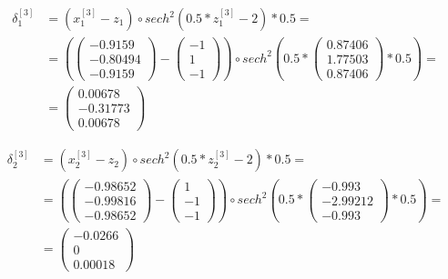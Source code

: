 \documentclass[12pt]{article}
\begin{document}
\begin{enumerate}[leftmargin=\labelsep]
          \begin{align*}
            \delta^{[3]}_1 &= (x^{[3]}_1 - z_1) \circ  sech^{2}(0.5*z^{[3]}_1 - 2) * 0.5 =  \\
            &=  (\begin{pmatrix} -0.9159 \\ -0.80494 \\ -0.9159\end{pmatrix} - \begin{pmatrix} -1 \\ 1 \\ -1 \end{pmatrix}) \circ sech^{2}(0.5* \begin{pmatrix} 0.87406 \\ 1.77503 \\ 0.87406\end{pmatrix} * 0.5) = \\
            &= \begin{pmatrix} 0.00678 \\ -0.31773 \\ 0.00678 \end{pmatrix} 
          \end{align*}

          \begin{align*}
            \delta^{[3]}_2 &= (x^{[3]}_2 - z_2) \circ  sech^{2}(0.5*z^{[3]}_2 - 2) * 0.5 =  \\
            &=  (\begin{pmatrix} -0.98652 \\ -0.99816 \\ -0.98652\end{pmatrix} - \begin{pmatrix} 1 \\ -1 \\ -1\end{pmatrix}) \circ sech^{2}(0.5* \begin{pmatrix} -0.993 \\ -2.99212 \\ -0.993\end{pmatrix} * 0.5) = \\
            &= \begin{pmatrix} -0.0266 \\ 0 \\ 0.00018 \end{pmatrix}
          \end{align*}


\end{enumerate}
\end{document}
